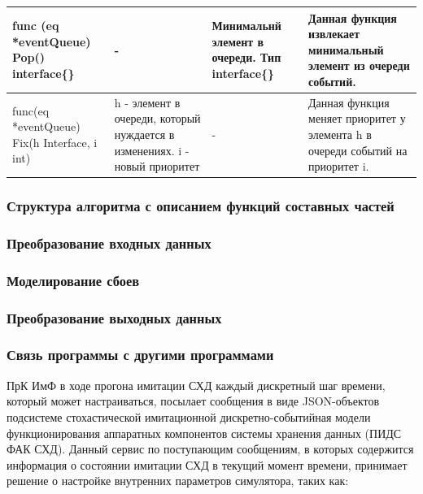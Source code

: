 \begin{table}[]
\begin{tabularx}{\textwidth}{|X|X|X|X|}
		func (eq *eventQueue) Pop() interface\{\}    & -                                                                          & Минимальнй элемент в очереди. Тип interface\{\} & Данная функция извлекает минимальный элемент из очереди событий.                                                                                                                                                         \\ \hline
		func(eq *eventQueue) Fix(h Interface, i int) & h - элемент в очереди, который нуждается в изменениях. i - новый приоритет & -                                               & Данная функция меняет приоритет у элемента h в очереди событий на приоритет i.                                                                                                                                           \\ \hline
	\end{tabularx}
\end{table}
	



\subsubsection{Структура алгоритма с описанием функций составных частей}

\subsubsection{Преобразование входных данных}


\subsubsection{Моделирование сбоев}

\subsubsection{Преобразование выходных данных}

\subsubsection{Связь программы с другими программами}
ПрК ИмФ в ходе прогона имитации СХД каждый дискретный шаг времени, который может настраиваться, посылает сообщения в виде JSON-объектов подсистеме стохастической имитационной дискретно-событийная модели функционирования аппаратных компонентов системы хранения данных (ПИДС ФАК СХД).  Данный сервис по поступающим сообщениям, в которых содержится информация о состоянии имитации СХД в текущий момент времени, принимает решение о настройке внутренних параметров симулятора, таких как:

